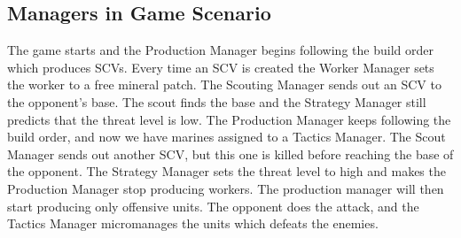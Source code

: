 	\subsection{Managers in Game Scenario}
		
		The game starts and the Production Manager begins following the build order which produces SCVs. Every time an SCV is created the 
		Worker Manager sets the worker to a free mineral patch. The Scouting Manager sends out an SCV to the opponent's base. The scout 
		finds the base and the Strategy Manager still predicts that the threat level is low. The Production Manager keeps following the build order, and now 
		we have marines assigned to a Tactics Manager. The Scout Manager sends out another SCV, but this one is killed before reaching the base of the 
		opponent. The Strategy Manager sets the threat level to high and makes the Production Manager stop producing workers. The production manager will then start producing only offensive units. 
		The opponent does the attack, and the Tactics Manager micromanages the units which defeats the enemies.
